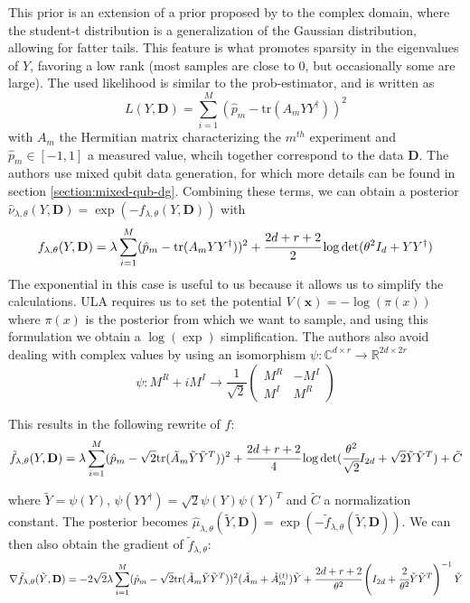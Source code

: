 \documentclass[12pt]{memoir}
\newcommand{\tr}{\text{tr}}
\newcommand{\mb}{\mathbf}
\begin{document}
This prior is an extension of a prior proposed by \cite{Dal20} to the complex domain, where the student-t distribution is a generalization of the Gaussian distribution, allowing for fatter tails. This feature is what promotes sparsity in the eigenvalues of $Y$, favoring a low rank (most samples are close to 0, but occasionally some are large).\medbreak
The used likelihood is similar to the prob-estimator, and is written as 
\begin{equation}
L(Y, \mb D) = \sum^{M}_{i=1} (\hat p_m - \tr(A_mYY^\dagger))^2
\end{equation}
with $A_m$ the Hermitian matrix characterizing the $m^{th}$ experiment and $\hat p_m \in [-1, 1]$ a measured value, whcih together correspond to the data $\mb D$. The authors use mixed qubit data generation, for which more details can be found in section \ref{section:mixed-qub-dg}. \medbreak
Combining these terms, we can obtain a posterior $\hat \nu_{\lambda, \theta}(Y, \mb D) = \exp(-f_{\lambda, \theta}(Y, \mb D))$ with
\begin{equation}
    f_{\lambda, \theta}(Y, \mb D) = \lambda \sum^{M}_{i=1} (\hat p_m - \tr(A_mYY^\dagger))^2 + \cfrac{2d + r + 2}{2}\log \det(\theta^2I_d + YY^\dagger)
\end{equation}
The exponential in this case is useful to us because it allows us to simplify the calculations. ULA requires us to set the potential $V(\mb x) = -\log(\pi(x))$ where $\pi(x)$ is the posterior from which we want to sample, and using this formulation we obtain a $\log(\exp)$ simplification.\medbreak
The authors also avoid dealing with complex values by using an isomorphism $\psi: \mathbb{C}^{d\times r}\rightarrow \mathbb{R}^{2d\times 2r}$
\begin{equation}
\psi: M^R + iM^I \rightarrow \frac{1}{\sqrt 2} \begin{pmatrix}
    M^R & - M^I\\
    M^I & M^R
\end{pmatrix}
\end{equation}

This results in the following rewrite of $f$:
\begin{equation}    
\tilde f_{\lambda, \theta}(Y, \mb D) = \lambda \sum^{M}_{i=1} (\hat p_m - \sqrt{2}\tr(\tilde A_m \tilde Y \tilde Y^{T}))^2 + \cfrac{2d + r + 2}{4}\log \det(\cfrac{\theta^2}{\sqrt 2}I_{2d} + \sqrt 2 \tilde Y \tilde Y^{T}) + \tilde C
\end{equation}

where $\tilde Y = \psi(Y)$, $\psi(YY^\dagger) = \sqrt{2} \psi(Y)\psi(Y)^{T}$ and $\tilde C$ a normalization constant. The posterior becomes $\hat \mu_{\lambda, \theta}(\tilde Y, \mb D) =\exp(-\tilde f_{\lambda, \theta}(\tilde Y, \mb D))$. We can then also obtain the gradient of $\tilde f_{\lambda, \theta}$:
\begin{equation}
\nabla \tilde f_{\lambda, \theta}(\tilde Y, \mb D) = -2\sqrt 2 \lambda \sum^{M}_{i=1} (\hat p_m - \sqrt{2}\tr(\tilde A_m \tilde Y \tilde Y^{T}))^2 (\tilde A_m + \tilde A^{(t)}_m)\tilde Y + \cfrac{2d + r + 2}{\theta^2} \left(I_{2d} + \cfrac{2}{\theta^2}\tilde Y \tilde Y^{T}\right)^{-1} \tilde Y
\end{equation}
\end{document}
